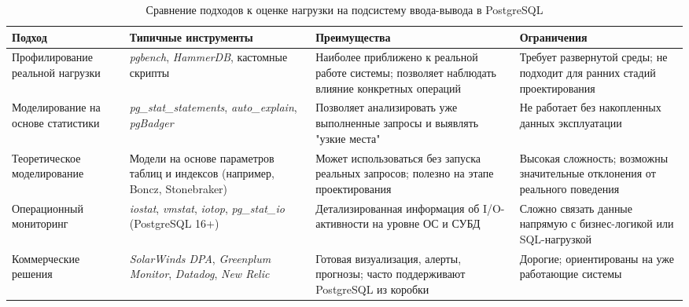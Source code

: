 \begin{table}[H]
\centering
\small
\begin{tabularx}{\textwidth}{@{}p{3.5cm}X>{\raggedright\arraybackslash}p{4.2cm}>{\raggedright\arraybackslash}p{3.5cm}@{}}
\toprule
\textbf{Подход} & \textbf{Типичные инструменты} & \textbf{Преимущества} & \textbf{Ограничения} \\
\midrule
Профилирование реальной нагрузки & \textit{pgbench}, \textit{HammerDB}, кастомные скрипты & Наиболее приближено к реальной работе системы; позволяет наблюдать влияние конкретных операций & Требует развернутой среды; не подходит для ранних стадий проектирования \\
\addlinespace
Моделирование на основе статистики & \textit{pg\_stat\_statements}, \textit{auto\_explain}, \textit{pgBadger} & Позволяет анализировать уже выполненные запросы и выявлять "узкие места" & Не работает без накопленных данных эксплуатации \\
\addlinespace
Теоретическое моделирование & Модели на основе параметров таблиц и индексов (например, Boncz, Stonebraker) & Может использоваться без запуска реальных запросов; полезно на этапе проектирования & Высокая сложность; возможны значительные отклонения от реального поведения \\
\addlinespace
Операционный мониторинг & \textit{iostat}, \textit{vmstat}, \textit{iotop}, \textit{pg\_stat\_io} (PostgreSQL 16+) & Детализированная информация об I/O-активности на уровне ОС и СУБД & Сложно связать данные напрямую с бизнес-логикой или SQL-нагрузкой \\
\addlinespace
Коммерческие решения & \textit{SolarWinds DPA}, \textit{Greenplum Monitor}, \textit{Datadog}, \textit{New Relic} & Готовая визуализация, алерты, прогнозы; часто поддерживают PostgreSQL из коробки & Дорогие; ориентированы на уже работающие системы \\
\bottomrule
\end{tabularx}
\caption{Сравнение подходов к оценке нагрузки на подсистему ввода-вывода в PostgreSQL}
\label{tab:io_approaches}
\end{table}
